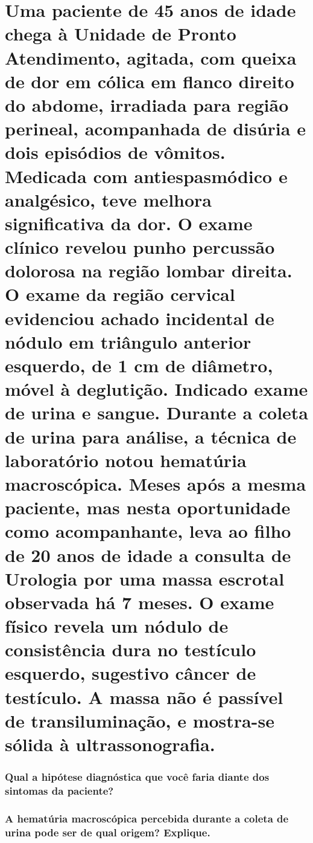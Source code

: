 \documentclass[11pt,notitlepage]{article}
\title{\vspace{-5ex}}
\date{\vspace{-5ex}}
\author{}
\begin{document}

\maketitle %

\part{Uma paciente de 45 anos de idade chega à Unidade de Pronto Atendimento, agitada, com queixa de dor em cólica em flanco direito do abdome, irradiada para região perineal, acompanhada de disúria e dois episódios de vômitos. Medicada com antiespasmódico e analgésico, teve melhora significativa da dor. O exame clínico revelou punho percussão dolorosa na região lombar direita. O exame da região cervical evidenciou achado incidental de nódulo em triângulo anterior esquerdo, de 1 cm de diâmetro, móvel à deglutição. Indicado exame de urina e sangue.  Durante a coleta de urina para análise, a técnica de laboratório notou hematúria macroscópica. Meses após a mesma paciente, mas nesta oportunidade como acompanhante, leva ao filho de 20 anos de idade a consulta de Urologia por uma massa escrotal observada há 7 meses. O exame físico revela um nódulo de consistência dura no testículo esquerdo, sugestivo câncer de testículo. A massa não é passível de transiluminação, e mostra-se sólida à ultrassonografia.}

\section{Qual a hipótese diagnóstica que você faria diante dos sintomas da paciente?}
\noindent\makebox[\linewidth]{\rule{\textwidth}{0.5pt}}
\noindent\makebox[\linewidth]{\rule{\textwidth}{0.5pt}}
\vspace{0.5cm}

\section{A hematúria macroscópica percebida durante a coleta de urina pode ser de qual origem? Explique.}
\noindent\makebox[\linewidth]{\rule{\textwidth}{0.5pt}}
\noindent\makebox[\linewidth]{\rule{\textwidth}{0.5pt}}
\vspace{0.5cm}
\end{document}
